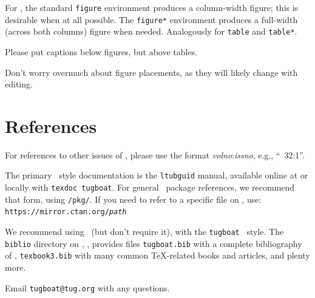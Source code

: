 \documentclass{ltugboat}
\begin{document}
For \TUB, the standard \texttt{figure} environment produces a
column-width figure; this is desirable when at all possible. The
\texttt{figure*} environment produces a full-width (across both columns)
figure when needed. Analogously for \texttt{table} and \texttt{table*}.

Please put captions below figures, but above tables.

Don't worry overmuch about figure placements, as they will likely change
with editing.

\section{References}

For references to other issues of \TUB, please use the format
\textsl{volno}:\textsl{issno}, e.g., ``\TUB\ 32:1''.

The primary \TUB\ style documentation is the \texttt{ltubguid} manual,
available online at  or locally with
\texttt{texdoc tugboat}. For general \CTAN\ package references, we
recommend that form, using \texttt{/pkg/}. If you need to refer to a
specific file on \CTAN, use:\\
\texttt{https://mirror.ctan.org/\textsl{path}}

We recommend using \BibTeX\ (but don't require it), with the
\texttt{tugboat} \BibTeX\ style. The \texttt{biblio} directory on \CTAN,
, provides files \texttt{tugboat.bib} with a
complete bibliography of \TUB, \texttt{texbook3.bib} with many common
\TeX-related books and articles, and plenty more.

Email \verb|tugboat@tug.org| with any questions.



\makesignature
\end{document}
